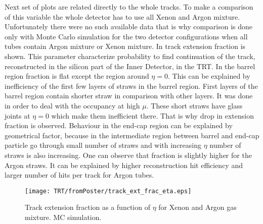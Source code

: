 Next set of plots are related directly to the whole tracks. To make a comparison of this variable the whole detector has to use all Xenon and Argon mixture.
Unfortunately there were no such available data that is why comparison is done only with Monte Carlo simulation for the two detector configurations when 
all tubes contain Argon mixture or Xenon mixture. In  track extension fraction is shown. This parameter characterize
probability to find continuation of the track, reconstructed in the silicon part of the Inner Detector, in the TRT.
In the barrel region fraction is flat except the region around $\eta = 0$. This can be explained by inefficiency of the first few layers of straws in the barrel region.
First layers of the barrel region contain shorter straw in comparison with other layers. It was done in order to deal with the occupancy at high $\mu$.
These short straws have glass joints at $\eta = 0$ which make them inefficient there. That is why drop in extension fraction is observed.
Behaviour in the end-cap region can be explained by geometrical factor, because in the intermediate region between barrel and end-cap particle
go through small number of straws and with increasing $\eta$ number of straws is also increasing.
One can observe that fraction is slightly higher for the Argon straws. It can be explained by higher reconstruction hit efficiency and larger number of hits per
track for Argon tubes.

\begin{figure}
\begin{center}
 \texttt{[image: TRT/fromPoster/track\_ext\_frac\_eta.eps]}
\caption{Track extension fraction as a function of $\eta$ for Xenon and Argon gas mixture. MC simulation.}
\label{fig:track_ext_fraction}
\end{center}
\end{figure}





